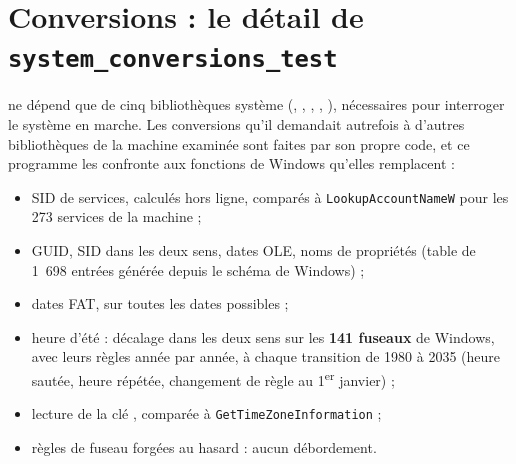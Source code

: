 \documentclass[11pt,a4paper,oneside]{report}
\begin{document}

\section{Conversions : le détail de \texttt{system\_conversions\_test}}

\wac{} ne dépend que de cinq bibliothèques système (,
, , , ),
nécessaires pour interroger le système en marche. Les conversions qu'il
demandait autrefois à d'autres bibliothèques de la machine examinée sont faites
par son propre code, et ce programme les confronte aux fonctions de Windows
qu'elles remplacent :

\begin{itemize}
  \item SID de services, calculés hors ligne, comparés à
    \texttt{LookupAccountNameW} pour les 273 services de la machine ;
  \item GUID, SID dans les deux sens, dates OLE, noms de propriétés (table de
    1~698 entrées générée depuis le schéma de Windows) ;
  \item dates FAT, sur toutes les dates possibles ;
  \item heure d'été : décalage dans les deux sens sur les \textbf{141 fuseaux}
    de Windows, avec leurs règles année par année, à chaque transition de 1980
    à 2035 (heure sautée, heure répétée, changement de règle au 1\textsuperscript{er}
    janvier) ;
  \item lecture de la clé , comparée à
    \texttt{GetTimeZoneInformation} ;
  \item règles de fuseau forgées au hasard : aucun débordement.
\end{itemize}
\end{document}
